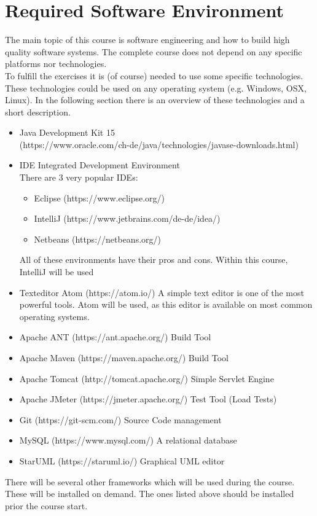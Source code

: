 
\section{Required Software Environment}
The main topic of this course is software engineering and how
to build high quality software systems. The complete course does
not depend on any specific platforms nor technologies.\\
To fulfill the exercises it is (of course) needed to use
some specific technologies. These technologies could be used
on any operating system (e.g. Windows, OSX, Linux). In the
following section there is an overview of these technologies and
a short description.\\

\begin{itemize}
\item Java Development Kit 15\\
(https://www.oracle.com/ch-de/java/technologies/javase-downloads.html)
\item IDE Integrated Development Environment\\
There are 3 very popular IDEs:
\begin{itemize}
\item Eclipse (https://www.eclipse.org/)
\item IntelliJ (https://www.jetbrains.com/de-de/idea/)
\item Netbeans (https://netbeans.org/)
\end{itemize}
All of these environments have their pros and cons. Within this course, IntelliJ
will be used
\item Texteditor Atom (https://atom.io/)
A simple text editor is one of the most powerful tools. Atom will be used, as
this editor is available on most common operating systems.
\item Apache ANT (https://ant.apache.org/)
Build Tool
\item Apache Maven (https://maven.apache.org/)
Build Tool
\item Apache Tomcat (http://tomcat.apache.org/)
Simple Servlet Engine
\item Apache JMeter (https://jmeter.apache.org/)
Test Tool (Load Tests)
\item Git (https://git-scm.com/)
Source Code management
\item MySQL (https://www.mysql.com/)
A relational database
\item StarUML (https://staruml.io/)
Graphical UML editor
\end{itemize}

\vspace{1mm}

There will be several other frameworks which will be used during the course.
These will be installed on demand. The ones listed above should be installed
prior the course start.
